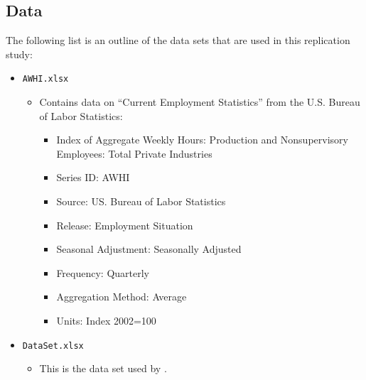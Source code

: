 \subsection{Data}
\label{sec:appendix_data}


The following list is an outline of the data sets that are used in this replication study:


\begin{itemize}
\item \texttt{AWHI.xlsx} 
	\begin{itemize}
		\item Contains data on ``Current Employment Statistics'' from the U.S. Bureau of Labor Statistics:
		\begin{itemize} 
		 	\item Index of Aggregate Weekly Hours: Production and Nonsupervisory Employees: Total Private Industries
			\item Series ID: AWHI
			\item Source: US. Bureau of Labor Statistics
			\item Release: Employment Situation
			\item Seasonal Adjustment: Seasonally Adjusted
			\item Frequency: Quarterly
			\item Aggregation Method: Average
			\item Units: Index 2002=100
		\end{itemize}
	\end{itemize}

\item \texttt{DataSet.xlsx}
	\begin{itemize}
		\item This is the data set used by \cite{JERMANNfinancial}.
	\end{itemize}


\end{itemize}
